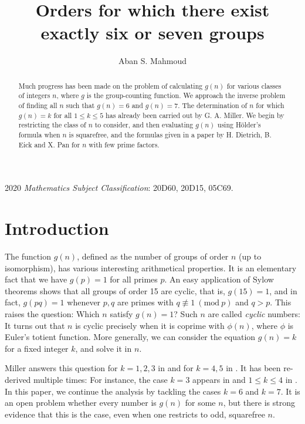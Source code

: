 \documentclass{article}
\newcommand{\Mod}[1]{\ (\mathrm{mod} \ #1)}
\theoremstyle{plain}
\theoremstyle{definition}
\begin{document}
\title{Orders for which there exist exactly six or seven groups}
\author{Aban S. Mahmoud}
\maketitle

\begin{abstract}
	Much progress has been made on the problem of calculating $g(n)$ for various classes of integers $n$,  where $g$ is the group-counting function. We approach the inverse problem of finding all $n$ such that $g(n) = 6$ and $g(n) = 7$. The determination of $n$ for which $g(n) = k$ for all $1 \le k \le 5$ has already been carried out by G. A. Miller. We begin by restricting the class of $n$ to consider, and then evaluating $g(n)$ using Hölder's formula when $n$ is squarefree, and the formulas given in a paper by H. Dietrich, B. Eick and X. Pan for $n$ with few prime factors.
\end{abstract}

\textup{2020} \textit{Mathematics Subject Classification}: \textup{20D60, 20D15, 05C69}.

\section{Introduction}
The function $g(n)$, defined as the number of groups of order $n$ (up to isomorphism), has various interesting arithmetical properties. It is an elementary fact that we have $g(p) = 1$ for all primes $p$. An easy application of Sylow theorems shows that all groups of order 15 are cyclic, that is, $g(15) = 1$, and in fact, $g(pq) = 1$ whenever $p, q$ are primes with $q \not\equiv 1 \Mod{p}$ and $q > p$. This raises the question: Which $n$ satisfy $g(n) = 1$? Such $n$ are called \emph{cyclic} numbers: It turns out that $n$ is cyclic precisely when it is coprime with $\phi(n)$, where $\phi$ is Euler's totient function. More generally, we can consider the equation $g(n) = k$ for a fixed integer $k$, and solve it in $n$.

Miller answers this question for $k = 1, 2, 3$ in {\cite{miller1}} and for $k = 4, 5$ in {\cite{miller2}}. It has been re-derived multiple times: For instance, the case $k = 3$ appears in {\cite{olsson}} and $1 \le k \le 4$ in {\cite{gnumoas}}. In this paper, we continue the analysis by tackling the cases $k = 6$ and $k = 7$. It is an open problem whether every number is $g(n)$ for some $n$, but there is strong evidence that this is the case, even when one restricts to odd, squarefree $n$.
\end{document}
